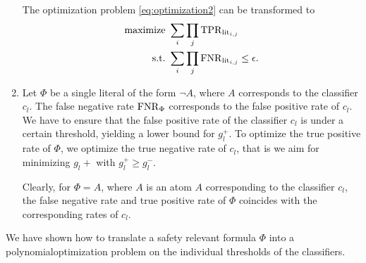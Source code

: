 \begin{enumerate}
  The optimization problem \eqref{eq:optimization2} can be transformed to
  \begin{align*}
    \textrm{maximize} &\ \sum_i \prod_j \mathrm{TPR}_{\mathrm{lit}_{i,j}}\\
    \textrm{s.t.} &\ \sum_i\prod_j \mathrm{FNR}_{\mathrm{lit}_{i,j}} \leq \epsilon\text.
  \end{align*}
\item Let $\Phi$ be a single literal of the form $\lnot A$,
  where $A$ corresponds to the classifier $c_l$.
  The false negative rate $\mathrm{FNR}_\Phi$ corresponds to the false positive rate
  of $c_l$. %
  We have to ensure that the false positive rate of the
  classifier $c_l$ is under a certain threshold, yielding a lower bound for
  $g_l^+$. To optimize the true positive rate of $\Phi$, we optimize
  the true negative rate of $c_l$, that is we aim for minimizing $g_l+$ with
  $g_l^+\geq g_l^-$.
  
  Clearly, for $\Phi=A$, where $A$ is an atom $A$ corresponding
  to the classifier $c_l$, the false negative rate and true positive rate
  of $\Phi$ coincides with the corresponding rates of $c_l$.
\end{enumerate}

We have shown how to translate a safety relevant formula $\Phi$ into a polynomialoptimization problem on the individual thresholds of the classifiers.

\endinput


%




